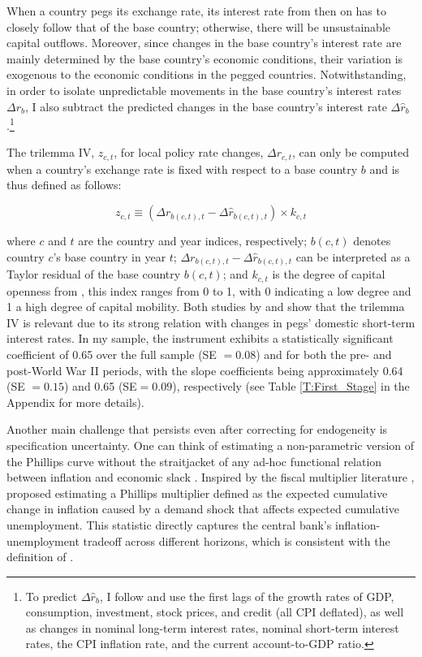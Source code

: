 \documentclass[12pt]{article}
\begin{document}
When a country pegs its exchange rate, its interest rate from then on has to closely follow that of the base country; otherwise, there will be unsustainable capital outflows. Moreover, since changes in the base country's interest rate are mainly determined by the base country's economic conditions, their variation is exogenous to the economic conditions in the pegged countries. Notwithstanding, in order to isolate unpredictable movements in the base country's interest rates $\Delta r_b$, I also subtract the predicted changes in the base country's interest rate $\Delta \hat{r}_b$.\footnote{To predict $\Delta \hat{r}_b$, I follow \cite{Jorda2019} and use the first lags of the growth rates of GDP, consumption, investment, stock prices, and credit (all CPI deflated), as well as changes in nominal long-term interest rates, nominal short-term interest rates, the CPI inflation rate, and the current account-to-GDP ratio.}

The trilemma IV, $z_{c,t}$, for local policy rate changes, $\Delta r_{c,t}$, can only be computed when a country's exchange rate is fixed with respect to a base country $b$ and is thus defined as follows:

\begin{equation} \label{EQ:trilemmaIV}
	z_{c,t} \equiv (\Delta r_{b(c,t),t} - \Delta \hat{r}_{b(c,t),t}) \times k_{c,t}
\end{equation}

where $c$ and $t$ are the country and year indices, respectively; $b(c,t)$ denotes country $c$'s base country in year $t$; $\Delta r_{b(c,t),t} - \Delta \hat{r}_{b(c,t),t}$ can be interpreted as a Taylor residual of the base country $b(c,t)$; and $k_{c,t}$ is the degree of capital openness from \cite{Quinn2011}, this index ranges from 0 to 1, with 0 indicating a low degree and 1 a high degree of capital mobility. Both studies by \cite{Jorda2019} and \cite{Schularick2020} show that the trilemma IV is relevant due to its strong relation with changes in pegs' domestic short-term interest rates. In my sample, the instrument exhibits a statistically significant coefficient of 0.65 over the full sample (SE $=0.08$) and for both the pre- and post-World War II periods, with the slope coefficients being approximately 0.64 (SE $=0.15$) and 0.65 (SE$=0.09$), respectively (see Table \ref{T:First_Stage} in the Appendix for more details).

Another main challenge that persists even after correcting for endogeneity is specification uncertainty. One can think of estimating a non-parametric version of the Phillips curve without the straitjacket of any ad-hoc functional relation between inflation and economic slack \citep{Gali2019}. Inspired by the fiscal multiplier literature \citep{Ramey2018}, \cite{Barnichon2019} proposed estimating a Phillips multiplier defined as the expected cumulative change in inflation caused by a demand shock that affects expected cumulative unemployment. This statistic directly captures the central bank's inflation-unemployment tradeoff across different horizons, which is consistent with the definition of \cite{Mankiw2001}.
\end{document}
